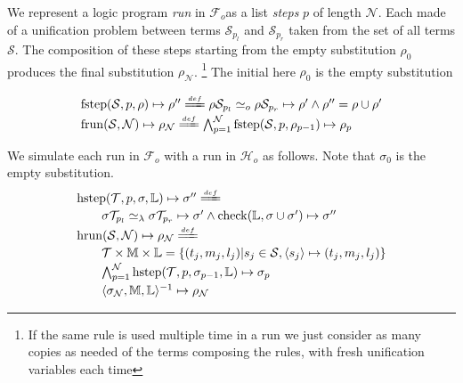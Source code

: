 \documentclass[sigconf,natbib=false,review]{acmart}
\newcommand{\UnifRel}{\ensuremath{\simeq}}
\newcommand{\Uo}{\ensuremath{\UnifRel_o}\xspace}
\newcommand{\Ue}{\ensuremath{\UnifRel_\lambda}\xspace}
\newcommand{\Fo}{\ensuremath{\mathcal{F}_{\!o}\xspace}} %
\newcommand{\Ho}{\ensuremath{\mathcal{H}_o}\xspace}
\begin{document}
We represent a logic program \emph{run} in \Fo as
a list \emph{steps} $p$ of length $\mathcal{N}$. Each made of a
unification problem between terms $\mathcal{S}_{p_l}$ and
$\mathcal{S}_{p_r}$ taken from the set of all terms $\mathcal{S}$.
The composition of these steps starting from the
empty substitution $\rho_0$ produces the final
substitution $\rho_\mathcal{N}$.
\footnote{If the same rule is used multiple time in a run we
just consider as many copies as needed of the terms composing the
rules, with fresh unification variables each time}
The initial here $\rho_0$ is the empty substitution
%
\newcommand{\progress}{\ensuremath{\mathrm{check}}\xspace}
\newcommand{\fstep}{\ensuremath{\mathrm{fstep}}\xspace}
\newcommand{\hstep}{\ensuremath{\mathrm{hstep}}\xspace}
\newcommand{\frun}{\ensuremath{\mathrm{frun}}\xspace}
\newcommand{\hrun}{\ensuremath{\mathrm{hrun}}\xspace}
\newcommand{\stepF}[4]{\ensuremath{\fstep(#1,#2,#3) \mapsto #4}}
\newcommand{\stepFD}[5]{%
\ensuremath{#3 #1_{#2_l} \Uo #3 #1_{#2_r} \mapsto #4 \land #5 = #3 \cup #4}}
\newcommand{\stepH}[5]{\ensuremath{\hstep(#1,#2,#3,#4) \mapsto #5}}
\newcommand{\stepHD}[6]{\ensuremath{%
#3 #1_{#2_l} \Ue #3 #1_{#2_r} \mapsto #4 \land \progress(#6,#3 \cup #4) \mapsto #5}}
\newcommand{\runF}[3]{\ensuremath{\frun(#1,#2) \mapsto #3_{#2}}}
\newcommand{\runFD}[2]{\ensuremath{%
\bigwedge_{p = 1}^{#2} \stepF{#1}{p}{\rho_{p-1}}{\rho_{p}}}}
\newcommand{\runH}[3]{\ensuremath{\hrun(#1,#2) \mapsto #3_{#2}}}
\newcommand{\runHD}[3]{\ensuremath{%
\bigwedge_{p = 1}^{#2} \stepH{#1}{p}{\sigma_{p-1}}{#3}{\sigma_{p}}}}
\newcommand{\deff}{\ensuremath{\stackrel{{\scriptscriptstyle def}}{=\!=\!\!\!=}}}
\def\linkStore{\ensuremath{\mathbb{L}}}

$$
\begin{array}{l}
\stepF{\mathcal{S}}{p}{\rho}{\rho''}
\deff
\stepFD{\mathcal{S}}{p}{\rho}{\rho'}{\rho''}\vspace{2pt}\\
\runF{\mathcal{S}}{\mathcal{N}}{\rho}
\deff
\runFD{\mathcal{S}}{\mathcal{N}}
\end{array}
$$

We simulate each run in \Fo{} with a run in \Ho as follows.
Note that $\sigma_0$ is the empty substitution.
$$
\begin{array}{l}
\stepH{\mathcal{T}}{p}{\sigma}{\linkStore}{\sigma''} \deff\vspace{2pt}\\
  \qquad\stepHD{\mathcal{T}}{p}{\sigma}{\sigma'}{\sigma''}{\linkStore}\vspace{2pt}\\
\runH{\mathcal{S}}{\mathcal{N}}{\rho} \deff \vspace{2pt}\\
  \qquad \mathcal{T} \times \mathbb{M} \times \linkStore = \{ (t_j,m_j,l_j) | s_j \in \mathcal{S}, \C{s_j}{t_j}{m_j}{l_j} \}\vspace{2pt}\\
  \qquad \runHD{\mathcal{T}}{\mathcal{N}}{\linkStore}\vspace{2pt}\\
  \qquad \D{\sigma_{\mathcal{N}}}{\mathbb{M}}{\linkStore}{\rho_{\mathcal{N}}}
\end{array}
$$
\end{document}
